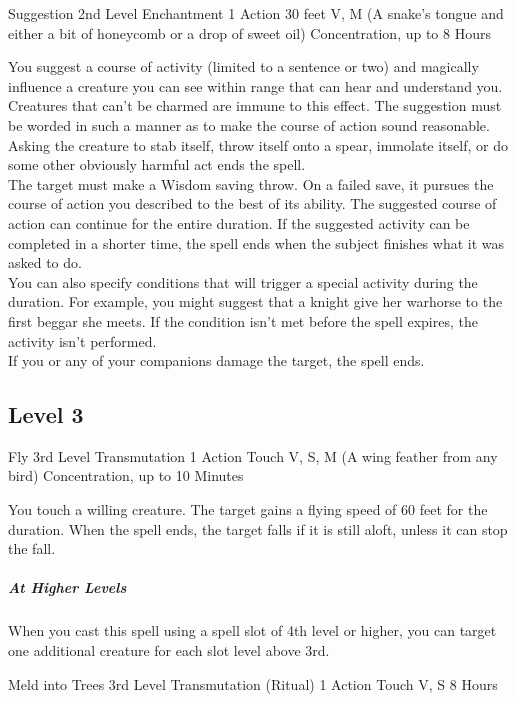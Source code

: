 \documentclass[letterpaper,openany,oneside,twocolumn]{book}
\begin{document}
\DndSpellHeader
  {Suggestion}
  {2nd Level Enchantment}
  {1 Action}
  {30 feet}
  {V, M (A snake's tongue and either a bit of honeycomb or a drop of sweet oil)}
  {Concentration, up to 8 Hours}

You suggest a course of activity (limited to a sentence or two) and magically influence a creature you can see within range that can hear and understand you. Creatures that can't be charmed are immune to this effect. The suggestion must be worded in such a manner as to make the course of action sound reasonable. Asking the creature to stab itself, throw itself onto a spear, immolate itself, or do some other obviously harmful act ends the spell.\\
The target must make a Wisdom saving throw. On a failed save, it pursues the course of action you described to the best of its ability. The suggested course of action can continue for the entire duration. If the suggested activity can be completed in a shorter time, the spell ends when the subject finishes what it was asked to do.\\
You can also specify conditions that will trigger a special activity during the duration. For example, you might suggest that a knight give her warhorse to the first beggar she meets. If the condition isn't met before the spell expires, the activity isn't performed.\\
If you or any of your companions damage the target, the spell ends.

\subsection*{Level 3}

\DndSpellHeader
  {Fly}
  {3rd Level Transmutation}
  {1 Action}
  {Touch}
  {V, S, M (A wing feather from any bird)}
  {Concentration, up to 10 Minutes}
  
You touch a willing creature. The target gains a flying speed of 60 feet for the duration. When the spell ends, the target falls if it is still aloft, unless it can stop the fall.

\subparagraph*{At Higher Levels} When you cast this spell using a spell slot of 4th level or higher, you can target one additional creature for each slot level above 3rd.

\DndSpellHeader
  {Meld into Trees}
  {3rd Level Transmutation (Ritual)}
  {1 Action}
  {Touch}
  {V, S}
  {8 Hours}
  
\end{document}

